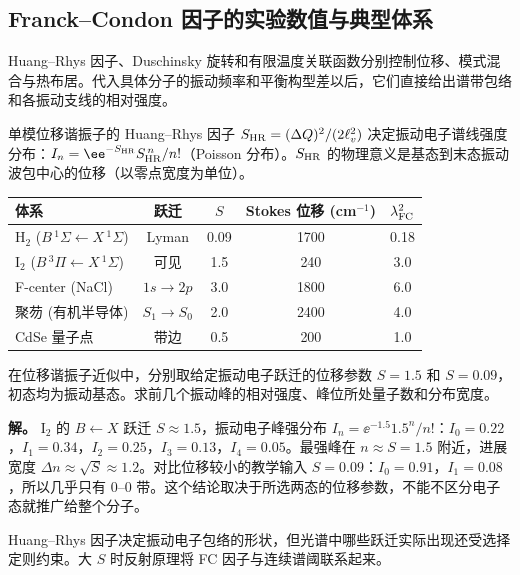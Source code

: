 \subsection{Franck--Condon 因子的实验数值与典型体系}\label{sec:fc-experiments}

Huang--Rhys 因子、Duschinsky 旋转和有限温度关联函数分别控制位移、模式混合与热布居。代入具体分子的振动频率和平衡构型差以后，它们直接给出谱带包络和各振动支线的相对强度。

单模位移谐振子的 Huang--Rhys 因子 \(S_{\rm HR}=(\Delta Q)^2/(2\ell_v^2)\) 决定振动电子谱线强度分布：\(I_n=\ee^{-S_{\rm HR}}S_{\rm HR}^{\,n}/n!\)（Poisson 分布）。\(S_{\rm HR}\) 的物理意义是基态到末态振动波包中心的位移（以零点宽度为单位）。

\begin{center}
\begin{tabular}{lcccc}
\hline
体系 & 跃迁 & \(S\) & Stokes 位移 (cm\(^{-1}\)) & \(\lambda_{\rm FC}^2\) \\
\hline
H\(_2\) (\(B\,{}^1\Sigma\leftarrow X\,{}^1\Sigma\)) & Lyman & 0.09 & 1700 & 0.18 \\
I\(_2\) (\(B\,{}^3\Pi\leftarrow X\,{}^1\Sigma\)) & 可见 & 1.5 & 240 & 3.0 \\
F-center (NaCl) & \(1s\to2p\) & 3.0 & 1800 & 6.0 \\
聚芴 (有机半导体) & \(S_1\to S_0\) & 2.0 & 2400 & 4.0 \\
CdSe 量子点 & 带边 & 0.5 & 200 & 1.0 \\
\hline
\end{tabular}
\end{center}

\begin{exbox}[\(I_2\) 的振动电子进展]
在位移谐振子近似中，分别取给定振动电子跃迁的位移参数 $S=1.5$ 和 $S=0.09$，初态均为振动基态。求前几个振动峰的相对强度、峰位所处量子数和分布宽度。

\textbf{解。} I\(_2\) 的 \(B\leftarrow X\) 跃迁 \(S\approx1.5\)，振动电子峰强分布 \(I_n=\ee^{-1.5}1.5^n/n!\)：\(I_0=0.22\)，\(I_1=0.34\)，\(I_2=0.25\)，\(I_3=0.13\)，\(I_4=0.05\)。最强峰在 \(n\approx S=1.5\) 附近，进展宽度 \(\Delta n\approx\sqrt{S}\approx1.2\)。对比位移较小的教学输入 \(S=0.09\)：\(I_0=0.91\)，\(I_1=0.08\)，所以几乎只有 0--0 带。这个结论取决于所选两态的位移参数，不能不区分电子态就推广给整个分子。
\end{exbox}

Huang--Rhys 因子决定振动电子包络的形状，但光谱中哪些跃迁实际出现还受选择定则约束。大 $S$ 时反射原理将 FC 因子与连续谱阈联系起来。


